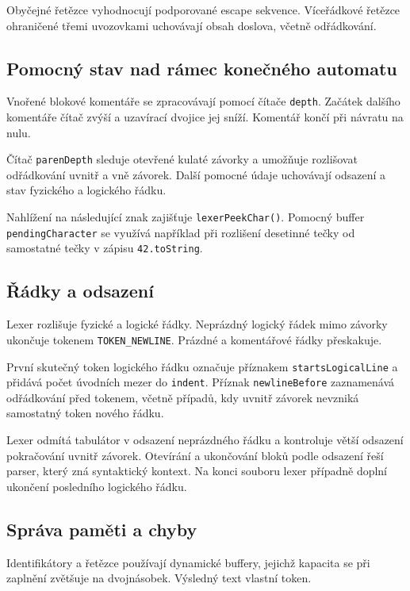 \documentclass{article}
\begin{document}
Obyčejné řetězce vyhodnocují podporované escape sekvence. Víceřádkové řetězce ohraničené třemi uvozovkami uchovávají obsah doslova, včetně odřádkování.

\subsection{Pomocný stav nad rámec konečného automatu}

Vnořené blokové komentáře se zpracovávají pomocí čítače \texttt{depth}. Začátek dalšího komentáře čítač zvýší a uzavírací dvojice jej sníží. Komentář končí při návratu na nulu.

Čítač \texttt{parenDepth} sleduje otevřené kulaté závorky a umožňuje rozlišovat odřádkování uvnitř a vně závorek. Další pomocné údaje uchovávají odsazení a stav fyzického a logického řádku.

Nahlížení na následující znak zajišťuje \texttt{lexerPeekChar()}. Pomocný buffer \texttt{pendingCharacter} se využívá například při rozlišení desetinné tečky od samostatné tečky v zápisu \texttt{42.toString}.

\subsection{Řádky a odsazení}

Lexer rozlišuje fyzické a logické řádky. Neprázdný logický řádek mimo závorky ukončuje tokenem \texttt{TOKEN\_NEWLINE}. Prázdné a komentářové řádky přeskakuje.

První skutečný token logického řádku označuje příznakem \texttt{startsLogicalLine} a přidává počet úvodních mezer do \texttt{indent}. Příznak \texttt{newlineBefore} zaznamenává odřádkování před tokenem, včetně případů, kdy uvnitř závorek nevzniká samostatný token nového řádku.

Lexer odmítá tabulátor v odsazení neprázdného řádku a kontroluje větší odsazení pokračování uvnitř závorek. Otevírání a ukončování bloků podle odsazení řeší parser, který zná syntaktický kontext. Na konci souboru lexer případně doplní ukončení posledního logického řádku.

\subsection{Správa paměti a chyby}

Identifikátory a řetězce používají dynamické buffery, jejichž kapacita se při zaplnění zvětšuje na dvojnásobek. Výsledný text vlastní token.
\end{document}
